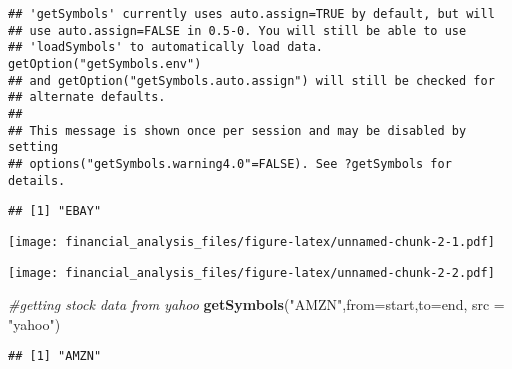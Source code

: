 \documentclass[]{article}
\newenvironment{Shaded}{\begin{snugshade}}{\end{snugshade}}
\newcommand{\KeywordTok}[1]{\textcolor[rgb]{0.13,0.29,0.53}{\textbf{#1}}}
\newcommand{\DataTypeTok}[1]{\textcolor[rgb]{0.13,0.29,0.53}{#1}}
\newcommand{\StringTok}[1]{\textcolor[rgb]{0.31,0.60,0.02}{#1}}
\newcommand{\CommentTok}[1]{\textcolor[rgb]{0.56,0.35,0.01}{\textit{#1}}}
\newcommand{\OperatorTok}[1]{\textcolor[rgb]{0.81,0.36,0.00}{\textbf{#1}}}
\newcommand{\NormalTok}[1]{#1}
\begin{document}
\begin{verbatim}
## 'getSymbols' currently uses auto.assign=TRUE by default, but will
## use auto.assign=FALSE in 0.5-0. You will still be able to use
## 'loadSymbols' to automatically load data. getOption("getSymbols.env")
## and getOption("getSymbols.auto.assign") will still be checked for
## alternate defaults.
## 
## This message is shown once per session and may be disabled by setting 
## options("getSymbols.warning4.0"=FALSE). See ?getSymbols for details.
\end{verbatim}

\begin{verbatim}
## [1] "EBAY"
\end{verbatim}

\begin{Shaded}
\end{Shaded}

\texttt{[image: financial\_analysis\_files/figure-latex/unnamed-chunk-2-1.pdf]}

\begin{Shaded}
\end{Shaded}

\texttt{[image: financial\_analysis\_files/figure-latex/unnamed-chunk-2-2.pdf]}

\begin{Shaded}
\begin{Highlighting}[]
\CommentTok{#getting stock data from yahoo}
\KeywordTok{getSymbols}\NormalTok{(}\StringTok{"AMZN"}\NormalTok{,}\DataTypeTok{from=}\NormalTok{start,}\DataTypeTok{to=}\NormalTok{end, }\DataTypeTok{src =} \StringTok{"yahoo"}\NormalTok{)}
\end{Highlighting}
\end{Shaded}

\begin{verbatim}
## [1] "AMZN"
\end{verbatim}
\end{document}
